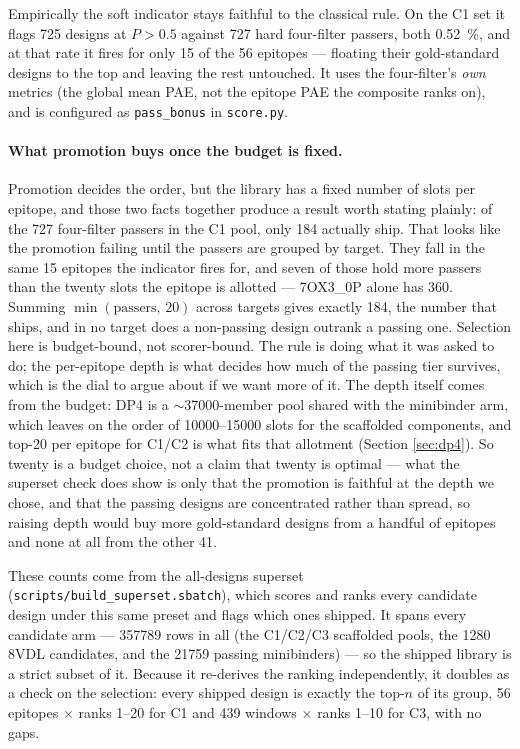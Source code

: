 Empirically the soft indicator stays faithful to the classical rule. On the C1 set it flags \num{725}
designs at $P>0.5$ against \num{727} hard four-filter passers, both \SI{0.52}{\percent}, and at that rate
it fires for only \num{15} of the \num{56} epitopes --- floating their gold-standard designs to the top
and leaving the rest untouched. It uses the four-filter's \emph{own} metrics (the global mean PAE, not
the epitope PAE the composite ranks on), and is configured as \texttt{pass\_bonus} in \texttt{score.py}.

\paragraph{What promotion buys once the budget is fixed.} Promotion decides the order, but the library
has a fixed number of slots per epitope, and those two facts together produce a result worth stating
plainly: of the \num{727} four-filter passers in the C1 pool, only \num{184} actually ship. That looks
like the promotion failing until the passers are grouped by target. They fall in the same \num{15}
epitopes the indicator fires for, and seven of those hold more passers than the twenty slots the epitope
is allotted --- 7OX3\_0P alone has \num{360}. Summing $\min(\text{passers},\,20)$ across targets gives
exactly \num{184}, the number that ships, and in no target does a non-passing design outrank a passing
one. Selection here is budget-bound, not scorer-bound. The rule is doing what it was asked to do; the
per-epitope depth is what decides how much of the passing tier survives, which is the dial to argue about
if we want more of it. The depth itself comes from the budget: DP4 is a $\sim$\num{37000}-member pool
shared with the minibinder arm, which leaves on the order of \num{10000}--\num{15000} slots for the
scaffolded components, and top-\num{20} per epitope for C1/C2 is what fits that allotment (Section
\ref{sec:dp4}). So twenty is a budget choice, not a claim that twenty is optimal --- what the superset
check does show is only that the promotion is faithful at the depth we chose, and that the passing
designs are concentrated rather than spread, so raising depth would buy more gold-standard designs from a
handful of epitopes and none at all from the other \num{41}.

These counts come from the all-designs superset (\texttt{scripts/build\_superset.sbatch}), which scores
and ranks every candidate design under this same preset and flags which ones shipped. It spans every
candidate arm --- \num{357789} rows in all (the C1/C2/C3 scaffolded pools, the \num{1280} 8VDL candidates,
and the \num{21759} passing minibinders) --- so the shipped library is a strict subset of it. Because it
re-derives the ranking independently, it doubles as a check on the selection: every shipped design is
exactly the top-$n$ of its group, \num{56} epitopes $\times$ ranks 1--20 for C1 and \num{439} windows
$\times$ ranks 1--10 for C3, with no gaps.
